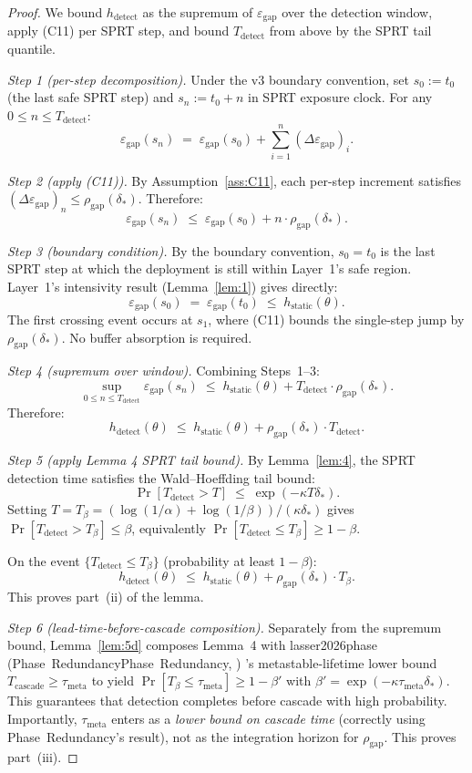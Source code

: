 \documentclass{article}
\makeatletter
\newcommand{\citep}[2][]{%
  \begingroup
  \def\@tmpkey{#2}%
  \ifx\@tmpkey\@empty\else
    (\ifx\@empty#1\@empty\else #1, \fi
     \@nameuse{bibkey@\@tmpkey})%
  \fi
  \endgroup
}
\newcommand{\deltastar}{\delta_{*}}
\newcommand{\rhogap}{\rho_{\mathrm{gap}}}
\newcommand{\epsgap}{\varepsilon_{\mathrm{gap}}}
\newcommand{\Tbeta}{T_{\beta}}
\makeatother
\begin{document}
\begin{proof}
We bound $h_{\mathrm{detect}}$ as the supremum of $\epsgap$ over
the detection window, apply (C11) per SPRT step, and bound
$T_{\mathrm{detect}}$ from above by the SPRT tail quantile.

\emph{Step 1 (per-step decomposition).}  Under the v3 boundary
convention, set $s_0 := t_0$ (the last safe SPRT step) and $s_n :=
t_0 + n$ in SPRT exposure clock.  For any
$0 \leq n \leq T_{\mathrm{detect}}$:
\[
  \epsgap(s_n) \;=\; \epsgap(s_0) + \sum_{i=1}^{n}
  (\Delta \epsgap)_i.
\]

\emph{Step 2 (apply (C11)).}  By Assumption~\ref{ass:C11}, each
per-step increment satisfies $(\Delta \epsgap)_n \leq
\rhogap(\deltastar)$.  Therefore:
\[
  \epsgap(s_n) \;\leq\; \epsgap(s_0) + n \cdot
  \rhogap(\deltastar).
\]

\emph{Step 3 (boundary condition).}  By the boundary convention,
$s_0 = t_0$ is the last SPRT step at which the deployment is still
within Layer~1's safe region.  Layer~1's intensivity result
(Lemma~\ref{lem:1}) gives directly:
\[
  \epsgap(s_0) \;=\; \epsgap(t_0) \;\leq\;
  h_{\mathrm{static}}(\theta).
\]
The first crossing event occurs at $s_1$, where (C11) bounds the
single-step jump by $\rhogap(\deltastar)$.  No buffer absorption is
required.

\emph{Step 4 (supremum over window).}  Combining Steps~1--3:
\[
  \sup_{0 \leq n \leq T_{\mathrm{detect}}} \epsgap(s_n)
  \;\leq\; h_{\mathrm{static}}(\theta) +
  T_{\mathrm{detect}} \cdot \rhogap(\deltastar).
\]
Therefore:
\[
  h_{\mathrm{detect}}(\theta) \;\leq\;
  h_{\mathrm{static}}(\theta) + \rhogap(\deltastar) \cdot
  T_{\mathrm{detect}}.
\]

\emph{Step 5 (apply Lemma 4 SPRT tail bound).}  By
Lemma~\ref{lem:4}, the SPRT detection time satisfies the
Wald--Hoeffding tail bound:
\[
  \Pr[T_{\mathrm{detect}} > T] \;\leq\; \exp(-\kappa T \deltastar).
\]
Setting $T = \Tbeta = (\log(1/\alpha) + \log(1/\beta)) /
(\kappa \deltastar)$ gives
$\Pr[T_{\mathrm{detect}} > \Tbeta] \leq \beta$, equivalently
$\Pr[T_{\mathrm{detect}} \leq \Tbeta] \geq 1-\beta$.

On the event $\{T_{\mathrm{detect}} \leq \Tbeta\}$ (probability
at least $1-\beta$):
\[
  h_{\mathrm{detect}}(\theta) \;\leq\;
  h_{\mathrm{static}}(\theta) + \rhogap(\deltastar) \cdot
  \Tbeta.
\]
This proves part~(ii) of the lemma.

\emph{Step 6 (lead-time-before-cascade composition).}  Separately
from the supremum bound, Lemma~\ref{lem:5d} composes Lemma~4 with
\citep[Phase~Redundancy]{lasser2026phase}'s metastable-lifetime
lower bound $T_{\mathrm{cascade}} \geq \tau_{\mathrm{meta}}$ to
yield $\Pr[\Tbeta \leq \tau_{\mathrm{meta}}] \geq 1 - \beta'$ with
$\beta' = \exp(-\kappa \tau_{\mathrm{meta}} \deltastar)$.  This
guarantees that detection completes before cascade with high
probability.  Importantly, $\tau_{\mathrm{meta}}$ enters as a
\emph{lower bound on cascade time} (correctly using
Phase~Redundancy's result), not as the integration horizon for
$\rhogap$.  This proves part~(iii).


\end{proof}
\end{document}
